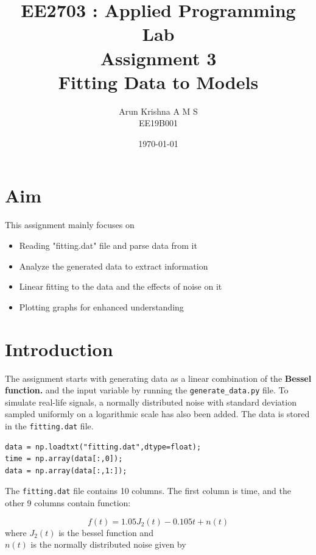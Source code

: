 \documentclass[12pt, a4paper]{report}
\title{\textbf{EE2703 : Applied Programming Lab \\ Assignment 3 \\ Fitting Data to Models}} %
\author{Arun Krishna A M S \\ EE19B001} %
\date{\today} %
\begin{document}
		
		
\maketitle %
\justifying
\section*{Aim}
This assignment mainly focuses on
\begin{itemize}
  	\item Reading "fitting.dat" file and parse data from it
  	\item Analyze the generated data to extract information
  	\item Linear fitting to the data and the effects of noise on it
  	\item Plotting graphs for enhanced understanding
\end{itemize}

\section*{Introduction}
The assignment starts with generating data as a linear combination of the \textbf{Bessel function.} and the input variable by running the \texttt{generate\_data.py} file. To simulate real-life signals, a normally distributed noise with standard deviation sampled uniformly on a logarithmic scale has also been added. The data is stored in the \texttt{fitting.dat} file.

\begin{verbatim}
data = np.loadtxt("fitting.dat",dtype=float);	
time = np.array(data[:,0]);
data = np.array(data[:,1:]);
\end{verbatim} 
The \texttt{fitting.dat} file contains 10 columns. The first column is time, and the other 9 columns contain function:

 \begin{equation*}
 f(t) = 1.05J_2(t) - 0.105t + n(t)
 \end{equation*}
where $J_2(t)$ is the bessel function and \\
$n(t)$ is the normally distributed noise given by \\
\end{document}
